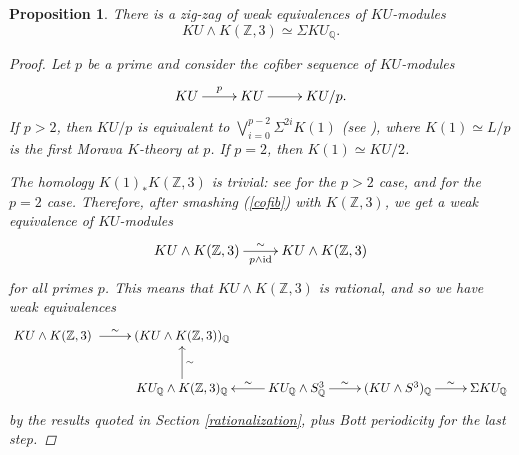 \documentclass[a4paper,11pt]{amsart} %
\theoremstyle{definition} \newtheorem{defn}[equation]{Definition}
\theoremstyle{remark} \newtheorem{notation}[equation]{Notation}
\theoremstyle{plain} \newtheorem{teo}[equation]{Theorem}
\theoremstyle{plain} \newtheorem{lema}[equation]{Lemma}
\theoremstyle{plain} \newtheorem{prop}[equation]{Proposition}
\theoremstyle{plain} \newtheorem{corolario}[equation]{Corollary}
\theoremstyle{remark} \newtheorem{obs}[equation]{Remark}
\theoremstyle{remark} \newtheorem{sideobs}[equation]{Side remark}
\theoremstyle{remark} \newtheorem{ejercicio}[equation]{Exercise}
\theoremstyle{definition} \newtheorem{notn}[equation]{Notation}
\theoremstyle{remark} \newtheorem{ej}[equation]{Example}
\theoremstyle{remark} \newtheorem{contraej}[equation]{Counterexample}
\theoremstyle{plain} \newtheorem{conj}[equation]{Conjecture}
\renewcommand{\1}{\ensuremath{\mathbbm{1}}}
\newcommand{\Q}{\mathbb{Q}}
\newcommand{\Z}{\mathbb{Z}}
\newcommand{\bprf}{\begin{proof}}
\newcommand{\eprf}{\end{proof}}
\newcommand{\id}{\mathrm{id}}
\numberwithin{equation}{section}
\begin{document}
\begin{prop} \label{kurat} There is a zig-zag of weak equivalences of $KU$-modules \[KU\wedge K(\Z,3) \simeq \Sigma KU_\Q.\]
\bprf Let $p$ be a prime and consider the cofiber sequence of $KU$-modules
\begin{equation}\label{cofib}\xymatrix{KU \ar[r]^-p & KU \ar[r] & KU/p %
.}\end{equation}
If $p>2$, then $KU/p$ is equivalent to $\bigvee\limits_{i=0}^{p-2} \Sigma^{2i} K(1)$ (see \cite[Lecture 4]{adams-lect}), where $K(1)\simeq L/p$ is the first Morava $K$-theory at $p$. If $p=2$, then $K(1) \simeq KU/2$.

The homology $K(1)_* K(\Z,3)$ is trivial: see \cite[Theorem 12.1]{rw80} for the $p>2$ case, and \cite[Appendix]{jw85} for the $p=2$ case. %
Therefore, after smashing (\ref{cofib}) with $K(\Z,3)$, we get a weak equivalence of $KU$-modules \[\xymatrix{KU \wedge K(\Z,3) \ar[r]_-{p \wedge \id}^\sim & KU \wedge K(\Z,3)}\]
for all primes $p$. This means that $KU\wedge K(\Z,3)$ is rational, and so we have weak equivalences
\begin{align*}
\xymatrix{
KU \wedge K(\Z,3) \ar[r]^-\sim &
(KU \wedge K(\Z,3))_\Q \\
&
\ar[u]_-\sim KU_\Q \wedge K(\Z,3)_\Q &
\ar[l]_-\sim KU_\Q \wedge S^3_\Q \ar[r]^-\sim &
(KU \wedge S^3)_\Q \ar[r]^-\sim &
\Sigma KU_\Q}\end{align*}
by the results quoted in Section \ref{rationalization}, plus Bott periodicity for the last step.
%
%
\eprf
\end{prop}

%
%
%
%
%
%
%
%
%
%
%
%
%
%
%
%
%
%
%
%
%
%
%
%
%
%
%
%
%
%
%
%
%
%
%
%
%
\end{document}
